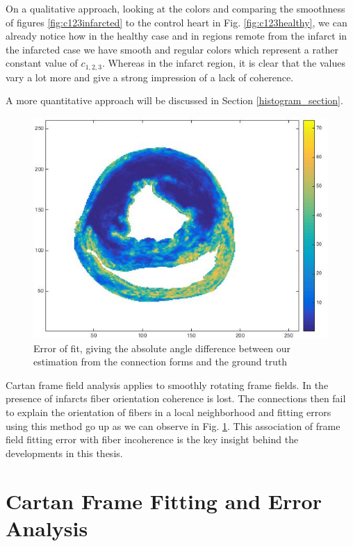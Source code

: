 On a qualitative approach, looking at the colors and comparing the smoothness of figures \ref{fig:c123infarcted} to the control heart in Fig. \ref{fig:c123healthy}, we can already notice how in the healthy case and in regions remote from the infarct in the infarcted case we have smooth and regular colors which represent a rather constant value of $c_{1,2,3}$. Whereas in the infarct region, it is clear that the values vary a lot more and give a strong impression of a lack of coherence.

A more quantitative approach will be discussed in Section \ref{histogram_section}.
 
\begin{figure}
    \centering
    \includegraphics[width=\textwidth]{figures/pig4_error_of_fit_slice_19}
    \caption{Error of fit, giving the absolute angle difference between our estimation from the connection forms and the ground truth}
    \label{fig:error_of_fit}
\end{figure}
 
Cartan frame field analysis applies to smoothly rotating frame fields. In the presence of infarcts fiber orientation coherence is lost. The connections then fail to explain the orientation of fibers in a local neighborhood and fitting errors using this method go up as we can observe in Fig. \ref{fig:error_of_fit}. This association of frame field fitting error with fiber incoherence is the key insight behind the developments in this thesis.

\section{Cartan Frame Fitting and Error Analysis}

